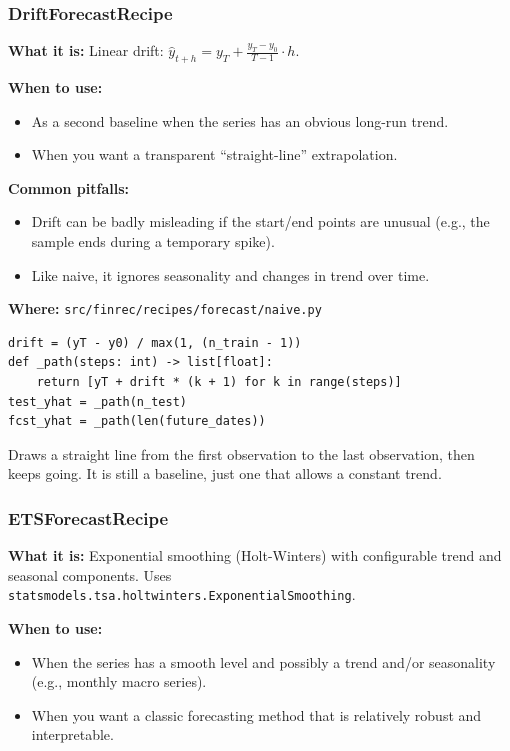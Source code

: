 \documentclass[11pt,a4paper]{article}
\begin{document}
\subsubsection{DriftForecastRecipe}\label{sec:drift}

\textbf{What it is:} Linear drift: $\hat{y}_{t+h} = y_T + \frac{y_T - y_0}{T-1} \cdot h$.

\textbf{When to use:}
\begin{itemize}[leftmargin=2em]
  \item As a second baseline when the series has an obvious long-run trend.
  \item When you want a transparent ``straight-line'' extrapolation.
\end{itemize}

\textbf{Common pitfalls:}
\begin{itemize}[leftmargin=2em]
  \item Drift can be badly misleading if the start/end points are unusual (e.g., the sample ends during a temporary spike).
  \item Like naive, it ignores seasonality and changes in trend over time.
\end{itemize}

\textbf{Where:} \texttt{src/finrec/recipes/forecast/naive.py}

\begin{lstlisting}
drift = (yT - y0) / max(1, (n_train - 1))
def _path(steps: int) -> list[float]:
    return [yT + drift * (k + 1) for k in range(steps)]
test_yhat = _path(n_test)
fcst_yhat = _path(len(future_dates))
\end{lstlisting}

\begin{intuitionbox}
Draws a straight line from the first observation to the last observation, then keeps going. It is still a baseline, just one that allows a constant trend.
\end{intuitionbox}

\subsubsection{ETSForecastRecipe}\label{sec:ets}

\textbf{What it is:} Exponential smoothing (Holt-Winters) with configurable trend and seasonal components. Uses \texttt{statsmodels.tsa.holtwinters.ExponentialSmoothing}.

\textbf{When to use:}
\begin{itemize}[leftmargin=2em]
  \item When the series has a smooth level and possibly a trend and/or seasonality (e.g., monthly macro series).
  \item When you want a classic forecasting method that is relatively robust and interpretable.
\end{itemize}
\end{document}

